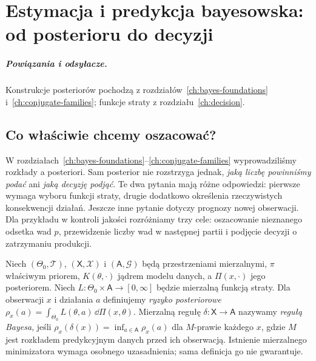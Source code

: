 \chapter{Estymacja i predykcja bayesowska: od posterioru do decyzji}
\label{ch:bayes-estimation-prediction}
\paragraph{Powiązania i odsyłacze.} Konstrukcje posteriorów pochodzą z rozdziałów~\ref{ch:bayes-foundations} i~\ref{ch:conjugate-families}; funkcje straty z rozdziału~\ref{ch:decision}.


\section{Co właściwie chcemy oszacować?}
W rozdziałach~\ref{ch:bayes-foundations}--\ref{ch:conjugate-families}
wyprowadziliśmy rozkłady a posteriori. Sam posterior nie rozstrzyga
jednak, \emph{jaką liczbę powinniśmy podać} ani \emph{jaką decyzję
podjąć}. Te dwa pytania mają różne odpowiedzi: pierwsze wymaga
wyboru funkcji straty, drugie dodatkowo określenia rzeczywistych
konsekwencji działań. Jeszcze inne pytanie dotyczy prognozy
nowej obserwacji. Dla przykładu w kontroli jakości rozróżniamy
trzy cele: oszacowanie nieznanego odsetka wad $p$, przewidzenie
liczby wad w następnej partii i podjęcie decyzji o zatrzymaniu produkcji.

\begin{definicja}
\label{def:bayes-rule-ch19}
Niech $(\Theta_0,\mathcal T)$, $(\mathsf X,\mathcal X)$ i
$(\mathsf A,\mathcal G)$ będą przestrzeniami mierzalnymi,
$\pi$ właściwym priorem, $K(\theta,\cdot)$ jądrem modelu danych,
a $\Pi(x,\cdot)$ jego posteriorem. Niech
$L:\Theta_0\times\mathsf A\to[0,\infty]$ będzie mierzalną
funkcją straty. Dla obserwacji $x$ i działania $a$ definiujemy
\emph{ryzyko posteriorowe}
$\rho_x(a)=\int_{\Theta_0}L(\theta,a)\,\dd\Pi(x,\theta)$.
Mierzalną regułę $\delta:\mathsf X\to\mathsf A$ nazywamy
\emph{regułą Bayesa}, jeśli $\rho_x(\delta(x))=\inf_{a\in\mathsf A}\rho_x(a)$
dla $M$-prawie każdego $x$, gdzie $M$ jest rozkładem
predykcyjnym danych przed ich obserwacją. Istnienie mierzalnego
minimizatora wymaga osobnego uzasadnienia; sama definicja go
nie gwarantuje.
\end{definicja}

